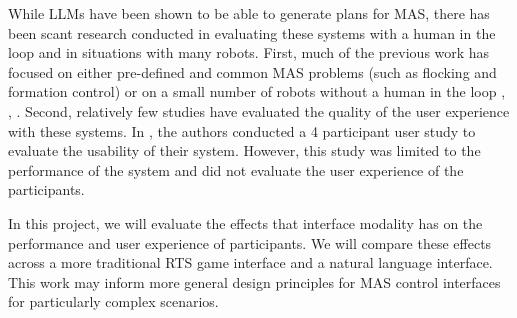 While LLMs have been shown to be able to generate plans for MAS, there has been scant research conducted in evaluating these systems with a human in the loop and in situations with many robots.  First, much of the previous work has focused on either pre-defined and common MAS problems (such as flocking and formation control) \cite{ji_genswarm_2026} or on a small number of robots without a human in the loop \cite{wang_decentralized_2026}, \cite{eumi_swarmchat_2026}, \cite{borate_comuros_2026}.  Second, relatively few studies have evaluated the quality of the user experience with these systems.  In \cite{xu_nl2hltl2plan_2025}, the authors conducted a 4 participant user study to evaluate the usability of their system.  However, this study was limited to the performance of the system and did not evaluate the user experience of the participants.

In this project, we will evaluate the effects that interface modality has on the performance and user experience of participants. We will compare these effects across a more traditional RTS game interface and a natural language interface.  This work may inform more general design principles for MAS control interfaces for particularly complex scenarios.
